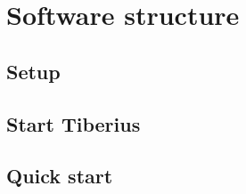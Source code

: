 \section{Software structure}
\pagestyle{aidan}

\subsection{Setup}

\subsection{Start Tiberius}

\subsection{Quick start}





